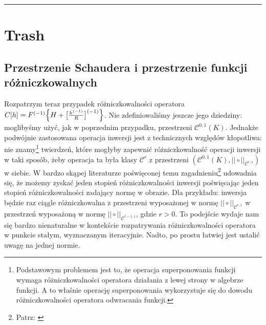 
\hrule


\listoffigures





%









\chapter{Trash}
\section{Przestrzenie Schaudera i przestrzenie funkcji różniczkowalnych}\label{Schauder}

Rozpatrzym teraz przypadek różniczkowalności operatora $ C[h] = F^{(-1)}\Bigl\{ H + \bigl [\frac{h^{(-1)}}{R}\bigl ]^{(-1)} \Bigl\}$. Nie zdefiniowaliśmy jeszcze jego dziedziny: moglibyśmy użyć, jak w poprzednim przypadku, przestrzeni $ \mathcal{C}^{0,1}(K) $. Jednakże podwójnie zastosowana operacja inwersji jest z technicznych względów kłopotliwa: nie znamy\footnote{Podstawowym problemem jest to, że operacja superponowania funkcji wymaga różniczkowalności operatora działania z lewej strony w algebrze funkcji. A to właśnie operację superponowania wykorzystuje się do dowodu różniczkowalności operatora odwracania funkcji.} twierdzeń, które mogłyby zapewnić różniczkowalność operacji inwersji w taki sposób, żeby operacja ta była klasy $ \mathcal{C}^{r} $ z przestrzeni $ (\mathcal{C}^{0,1}(K), || \circ ||_{\mathcal{C}^{r,1}}) $ w siebie. W bardzo skąpej literaturze poświęconej temu zagadnieniu\footnote{Patrz: \citet{Lanza1, Lanza2}} udowadnia się, że możemy zyskać jeden stopień różniczkowalności inwersji poświęcając jeden stopień różniczkowalności zadający normę w obrazie. Dla przykładu: inwersja będzie raz ciągle różniczkowalna z przestrzeni wyposażonej w normę $ || \circ ||_{\mathcal{C}^{r,1}} $ w przestrzeń wyposażoną w normę $ || \circ ||_{\mathcal{C}^{r-1,1}} $, gdzie $ r > 0 $. To podejście wydaje nam się bardzo nienaturalne w kontekście rozpatrywania różniczkowalności operatora w punkcie stałym, wyznaczanym iteracyjnie. Nadto, po prostu łatwiej jest ustalić uwagę na jednej normie. 


